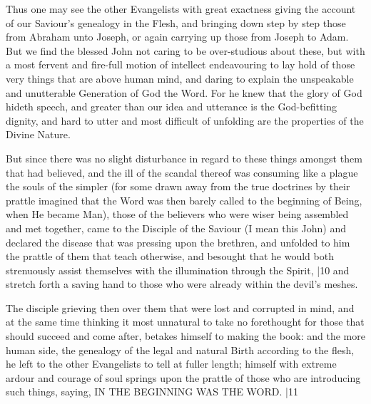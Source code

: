 Thus one may see the other Evangelists with great exactness giving the account of our Saviour's genealogy in the Flesh, and bringing down step by step those from Abraham unto Joseph, or again carrying up those from Joseph to Adam. But we find the blessed John not caring to be over-studious about these, but with a most fervent and fire-full motion of intellect endeavouring to lay hold of those very things that are above human mind, and daring to explain the unspeakable and unutterable Generation of God the Word. For he knew that the glory of God hideth speech, and greater than our idea and utterance is the God-befitting dignity, and hard to utter and most difficult of unfolding are the properties of the Divine Nature.


But since there was no slight disturbance in regard to these things amongst them that had believed, and the ill of the scandal thereof was consuming like a plague the souls of the simpler (for some drawn away from the true doctrines by their prattle imagined that the Word was then barely called to the beginning of Being, when He became Man), those of the believers who were wiser being assembled and met together, came to the Disciple of the Saviour (I mean this John) and declared the disease that was pressing upon the brethren, and unfolded to him the prattle of them that teach otherwise, and besought that he would both strenuously assist themselves with the illumination through the Spirit, |10 and stretch forth a saving hand to those who were already within the devil's meshes.

The disciple grieving then over them that were lost and corrupted in mind, and at the same time thinking it most unnatural to take no forethought for those that should succeed and come after, betakes himself to making the book: and the more human side, the genealogy of the legal and natural Birth according to the flesh, he left to the other Evangelists to tell at fuller length; himself with extreme ardour and courage of soul springs upon the prattle of those who are introducing such things, saying, IN THE BEGINNING WAS THE WORD. |11
